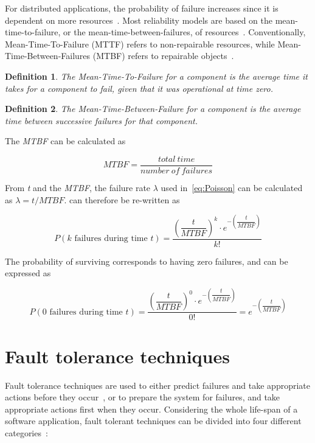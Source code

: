 \documentclass{cslthse-msc}
\newtheorem{definition}{Definition}[chapter]
\begin{document}
For distributed applications, the probability of failure increases since it is dependent on more resources~\cite{relModelDistSimSystem}. Most reliability models are based on the mean-time-to-failure, or the mean-time-between-failures, of resources~\cite{relModelAnalysis}. Conventionally, Mean-Time-To-Failure (MTTF) refers to non-repairable resources, while Mean-Time-Between-Failures (MTBF) refers to repairable objects~\cite{effTaskReplMobGrid}.

\begin{definition} \label{def:mttf}
The Mean-Time-To-Failure for a component is the average time it takes for a component to fail, given that it was operational at time zero.
\end{definition}

\begin{definition} \label{def:MTBF}
The Mean-Time-Between-Failure for a component is the average time between successive failures for that component.
\end{definition}

The \emph{MTBF} can be calculated as

\begin{equation} \label{eq:MTBF}
MTBF = \frac{total\ time}{number\ of\ failures}
\end{equation}

From \emph{t} and the \emph{MTBF}, the failure rate $\lambda$ used in~\cref{eq:Poisson} can be calculated as $\lambda = t/MTBF$.  can therefore be re-written as

\begin{equation} \label{eq:Poisson_during_time_t}
P(k \mbox{ failures during time } t) = \dfrac{\left(\dfrac{t}{MTBF}\right)^k \cdot e^{-\left(\dfrac{t}{MTBF}\right)}}{k!}
\end{equation}

The probability of surviving corresponds to having zero failures, and can be expressed as

\begin{equation} \label{eq:Poisson_no_failures}
P(0 \mbox{ failures during time } t) = \dfrac{\left(\dfrac{t}{MTBF}\right)^0 \cdot e^{-\left(\dfrac{t}{MTBF}\right)}}{0!} = e^{-\left(\dfrac{t}{MTBF}\right)}
\end{equation}

\section{Fault tolerance techniques} \label{sec:background_fault_tol_tech}
Fault tolerance techniques are used to either predict failures and take appropriate actions before they occur~\cite{faultToleranceChallenges}, or to prepare the system for failures, and take appropriate actions first when they occur. Considering the whole life-span of a software application, fault tolerant techniques can be divided into four different categories~\cite{surveyReliabilityDistr}:
\end{document}
